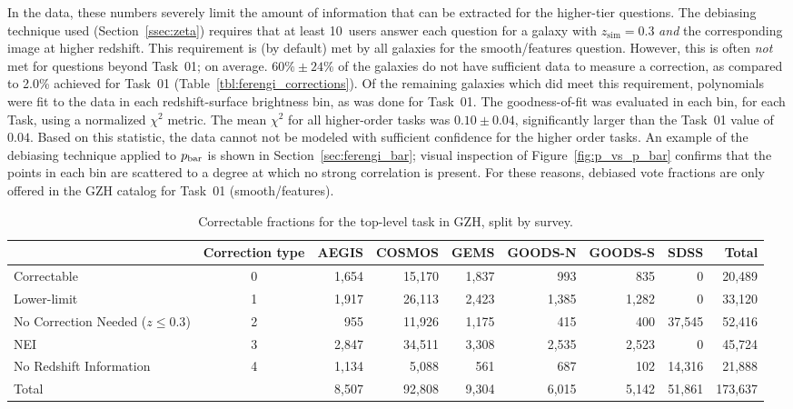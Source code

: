 \documentclass[twocolumn]{aastex6}
\begin{document}
In the \ferengi{} data, these numbers severely limit the amount of information that can be extracted for the higher-tier questions. The debiasing technique used (Section~\ref{ssec:zeta}) requires that at least 10~users answer each question for a galaxy with $z_\mathrm{sim}=0.3$ \emph{and} the corresponding image at higher redshift. This requirement is (by default) met by all galaxies for the smooth/features question. However, this is often \emph{not} met for questions beyond Task~01; on average. $60\%\pm24\%$ of the galaxies do not have sufficient data to measure a correction, as compared to 2.0\% achieved for Task~01 (Table~\ref{tbl:ferengi_corrections}). Of the remaining \ferengi{} galaxies which did meet this requirement, polynomials were fit to the data in each redshift-surface brightness bin, as was done for Task~01. The goodness-of-fit was evaluated in each bin, for each Task, using a normalized $\chi^2$ metric. The mean $\chi^2$ for all higher-order tasks was $0.10\pm0.04$, significantly larger than the Task~01 value of $0.04$. Based on this statistic, the data cannot not be modeled with sufficient confidence for the higher order tasks. An example of the debiasing technique applied to $p_{\rm bar}$ is shown in Section~\ref{sec:ferengi_bar}; visual inspection of Figure~\ref{fig:p_vs_p_bar} confirms that the points in each bin are scattered to a degree at which no strong correlation is present. For these reasons, debiased vote fractions are only offered in the GZH catalog for Task~01 (smooth/features).  

\begin{table}
\caption{Correctable fractions for the top-level task in GZH, split by survey.}\label{tbl:hubble_debiasable}
\begin{tabular}{lcrrrrrrr}
\hline\hline
                                   & Correction type & AEGIS   & COSMOS & GEMS & GOODS-N & GOODS-S    & SDSS    & Total \\
\hline
Correctable                        & 0               & 1,654   & 15,170 & 1,837 & 993    & 835     	& 0       & 20,489\\
Lower-limit                        & 1               & 1,917   & 26,113 & 2,423 & 1,385  & 1,282   	& 0       & 33,120\\
No Correction Needed ($z \le 0.3$) & 2               & 955     & 11,926 & 1,175 & 415    & 400     	& 37,545  & 52,416\\ 
NEI                                & 3               & 2,847   & 34,511 & 3,308 & 2,535  & 2,523   	& 0       & 45,724\\
No Redshift Information            & 4               & 1,134   & 5,088  & 561   & 687    & 102   		& 14,316  & 21,888\\
\hline
Total                              &                 & 8,507   & 92,808 & 9,304 & 6,015  & 5,142   	& 51,861  & 173,637\\
\hline\hline
\end{tabular}
\end{table}
\end{document}
